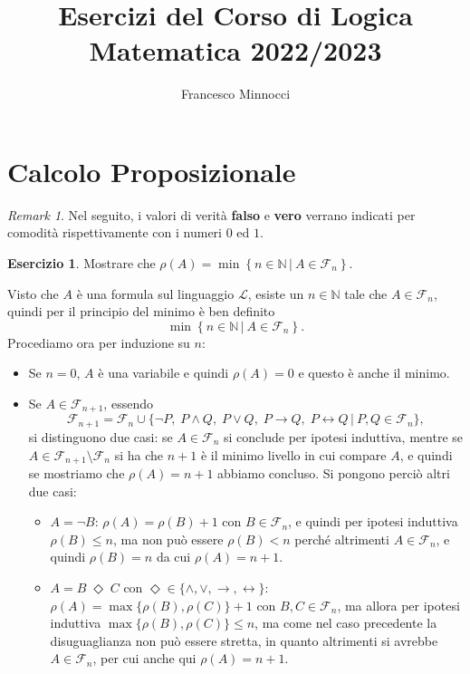 \documentclass[a4paper]{article}
\title{Esercizi del Corso di Logica Matematica 2022/2023}
\author{Francesco Minnocci}
\newcommand{\N}{\mathbb{N}}
\newcommand{\limplies}{\rightarrow}
\newcommand{\liff}{\leftrightarrow}
\theoremstyle{definition}
\theoremstyle{definition}
\theoremstyle{remark}
\newtheorem*{remark}{Remark}
\theoremstyle{definition}
\newtheorem{exercise}{Esercizio}[section]
\begin{document}
\maketitle
\section{Calcolo Proposizionale}
\begin{remark}
	Nel seguito, i valori di verità \textbf{falso} e \textbf{vero} verrano indicati per comodità rispettivamente con i numeri $0$ ed $1$.
\end{remark}
\setcounter{exercise}{6}
\begin{exercise}
	Mostrare che \(\rho(A)=\min\left\{ n\in\N \,|\: A\in \mathcal{F}_n \right\} \).
\end{exercise}
Visto che \(A\) è una formula sul linguaggio \(\mathcal{L}\), esiste un \( n \in \N \) tale che \(A\in \mathcal{F}_n\), quindi per il principio del minimo è ben definito
\[\min\left\{ n\in\N \,|\: A\in \mathcal{F}_n \right\}.\]
Procediamo ora per induzione su \(n\):
\begin{itemize}
	\item Se \(n=0\), \(A\) è una variabile e quindi \(\rho\left( A \right) =0\) e questo è anche il minimo.
	\item Se \(A\in \mathcal{F}_{n+1}\), essendo \[ \mathcal{F}_{n+1}=\mathcal{F}_n\cup \{\lnot P,\; P \land Q ,\; P\lor Q,\; P \limplies Q,\; P \liff Q \,|\: P,Q \in
		\mathcal{F}_n\} ,\]si distinguono due casi:
		se \(A\in \mathcal{F}_{n}\) si conclude per ipotesi induttiva, mentre se \(A\in \mathcal{F}_{n+1}\setminus \mathcal{F}_n\) si ha che \(n+1\) è il minimo livello in cui
		compare \(A\), e quindi se mostriamo che \(\rho(A)=n+1 \) abbiamo concluso. Si pongono perciò altri due casi:
		\begin{itemize}
			\item \(A=\lnot B\): \(\rho\left( A \right) = \rho\left( B \right) + 1\) con \(B\in \mathcal{F}_n\), e quindi per ipotesi induttiva \(\rho(B) \leq n\), ma non può essere \(\rho(B)<n\) perché altrimenti
				\(A\in \mathcal{F}_n\), e quindi \(\rho(B)=n\) da cui \(\rho(A)=n+1\).
			\item \(A=B\;\Diamond\;C\) con \(\Diamond\in\{\land,\lor,\limplies,\liff\}\): \(\rho(A)=\max\{\rho(B),\rho(C)\}+1\) con \(B,C\in \mathcal{F}_n\), ma allora
				per ipotesi induttiva \(\max\{\rho(B),\rho(C)\}\leq n\), ma come nel caso precedente la disuguaglianza non può essere stretta, in quanto altrimenti si
				avrebbe \(A\in \mathcal{F}_n\), per cui anche qui \(\rho(A)=n+1\).
		\end{itemize}
\end{itemize}
\end{document}
